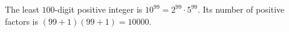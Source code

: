 The least $100$-digit positive integer is $10^{99}=2^{99}\cdot5^{99}$. Its number of positive factors is $(99+1)(99+1)=\boxed{10000}$.
